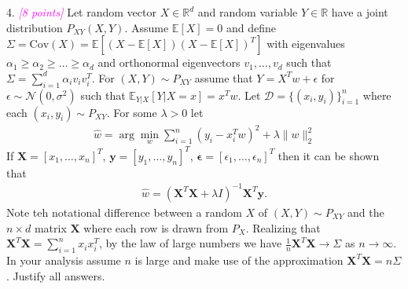 \documentclass{article}
\newcommand{\1}{\mathbf{1}}
\def\E{\mathbb{E}}
\def\R{\mathbb{R}}
\newcommand{\mb}[1]{\mathbf{#1}}
\newcommand{\grade}[1]{\small\textcolor{magenta}{\emph{[#1 points]}} \normalsize}
\begin{document}
4.  \grade{8} Let random vector $X \in \R^d$ and random variable $Y \in \R$ have a joint distribution $P_{XY}(X,Y)$. 
Assume $\E[X]=0$ and define $\Sigma = \text{Cov}(X)=\E[(X-\E[X])(X-\E[X])^T]$ with eigenvalues $\alpha_1 \geq \alpha_2 \geq \dots \geq \alpha_d$ and orthonormal eigenvectors $v_1,\dots,v_d$ such that $\Sigma = \sum_{i=1}^d \alpha_i v_i v_i^T$.
For $(X,Y) \sim P_{XY}$ assume that $Y = X^T w + \epsilon$ for $\epsilon \sim \mathcal{N}(0,\sigma^2)$ such that $\E_{Y|X}[ Y | X=x] = x^T w$.
Let $\mathcal{D}=\{(x_i,y_i)\}_{i=1}^n$ where each $(x_i,y_i) \sim P_{XY}$.
For some $\lambda >0$ let 
\begin{align*}
\widehat{w} = \arg\min_w \sum_{i=1}^n (y_i - x_i^T w)^2 + \lambda \| w \|_2^2
\end{align*}
If $\mb{X}=[x_1,\dots,x_n]^T$, $\mb{y} = [y_1,\dots,y_n]^T$, $\boldsymbol{\epsilon} = [\epsilon_1,\dots,\epsilon_n]^T$ then it can be shown that 
\begin{align}\label{eq:ridge_soln}
\widehat{w} = (\mb{X}^T \mb{X} + \lambda I)^{-1} \mb{X}^T \mb{y}.
\end{align}
Note teh notational difference between a random $X$ of $(X,Y)\sim P_{XY}$ and the $n \times d$ matrix $\mb{X}$ where each row is drawn from $P_X$.
Realizing that $\mb{X}^T \mb{X} = \sum_{i=1}^n x_i x_i^T$, by the law of large numbers we have $\frac{1}{n} \mb{X}^T\mb{X} \rightarrow \Sigma$ as $n \rightarrow \infty$. 
In your analysis assume $n$ is large and make use of the approximation $\mb{X}^T \mb{X} = n \Sigma$.
Justify all answers.
\end{document}
